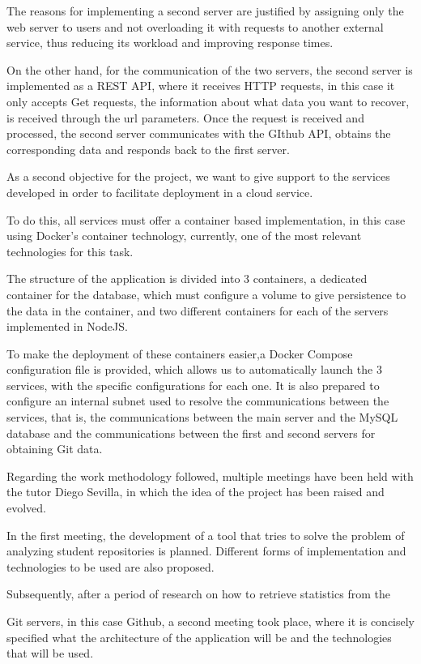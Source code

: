 The reasons for implementing a second server are justified by assigning only the web server to users and not overloading it with requests to another external service, thus reducing its workload and improving response times.

On the other hand, for the communication of the two servers, the second server is implemented as a REST API, where it receives HTTP requests, in this case it only accepts Get requests, the information about what data you want to recover, is received through the url parameters. Once the request is received and processed, the second server communicates with the GIthub API, obtains the corresponding data and responds back to the first server.


As a second objective for the project, we want to give support to the services developed in order to facilitate deployment in a cloud service.

To do this, all services must offer a container based implementation, in this case using Docker's container technology, currently, one of the most relevant technologies for this task.

The structure of the application is divided into 3 containers, a dedicated container for the database, which must configure a volume to give persistence to the data in the container, and two different containers for each of the servers implemented in NodeJS.

To make the deployment of these containers easier,a Docker Compose configuration file is provided, which allows us to automatically launch the 3 services, with the specific configurations for each one. It is also prepared to configure an internal subnet used to resolve the communications between the services, that is, the communications between the main server and the MySQL database and the communications between the first and second servers for obtaining Git data.

Regarding the work methodology followed, multiple meetings have been held with the tutor Diego Sevilla, in which the idea of the project has been raised and evolved.

In the first meeting, the development of a tool that tries to solve the problem of analyzing student repositories is planned. Different forms of implementation and technologies to be used are also proposed.

Subsequently, after a period of research on how to retrieve statistics from the

Git servers, in this case Github, a second meeting took place, where it is concisely specified what the architecture of the application will be and the technologies that will be used.

